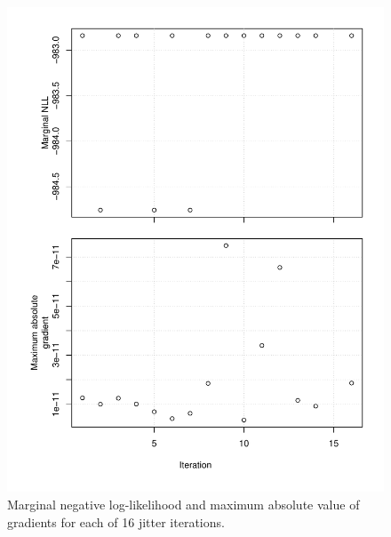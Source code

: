 \documentclass[
]{article}
\begin{document}
\begin{figure}

{\centering \includegraphics{bsb_models_wp_files/figure-latex/jitter-res-1-1} 

}

\caption{Marginal negative log-likelihood and maximum absolute value of gradients for each of 16 jitter iterations.}\label{fig:jitter-res-1}
\end{figure}
\clearpage
\end{document}
